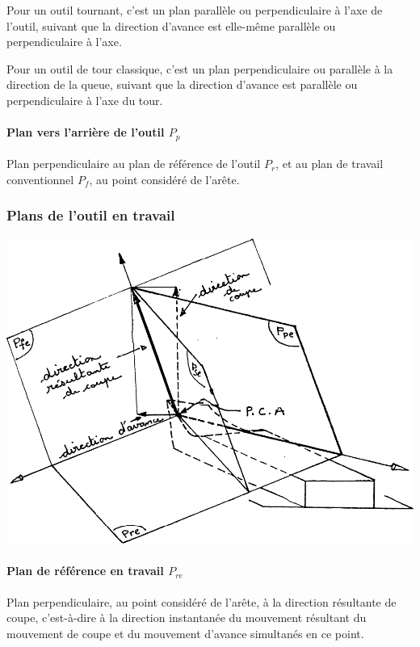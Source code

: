 \documentclass[11pt,oneside]{article}
\begin{document}
Pour un outil tournant, c'est un plan parallèle ou perpendiculaire à l'axe de l'outil, suivant que la direction d'avance est elle-même parallèle ou perpendiculaire à l'axe.

Pour un outil de tour classique, c'est un plan perpendiculaire ou parallèle à la direction de la queue, suivant que la direction d'avance est parallèle ou perpendiculaire à l'axe du tour. 

\paragraph{Plan vers l'arrière de l'outil $P_p$} 
Plan perpendiculaire au plan de référence de l'outil $P_r$, et au plan de travail conventionnel $P_f$, au point considéré de l'arête. 






\subsubsection{Plans de l'outil en travail}

\begin{center}
\includegraphics[width=.8\textwidth]{png/fig_14}
\end{center}

\paragraph{Plan de référence en travail $P_{re}$}

Plan perpendiculaire, au point considéré de l'arête, à la direction résultante de coupe, c'est-à-dire à la direction instantanée du mouvement résultant du mouvement de coupe et du mouvement d'avance simultanés en ce point. 
\end{document}

